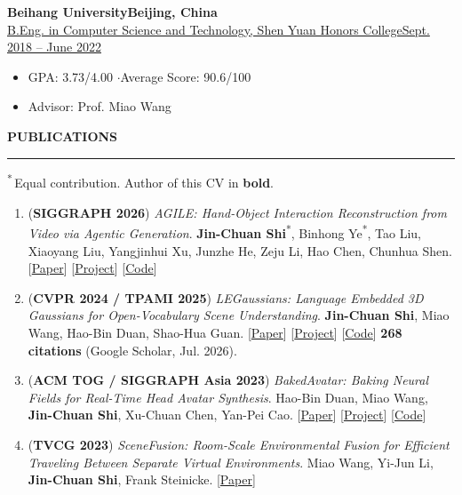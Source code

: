 \documentclass[10pt,a4paper]{article}
\newcommand{\cvsection}[1]{%
  \vspace{0.7em}%
  {\rmfamily\large\bfseries\MakeUppercase{#1}}\\[-0.3em]%
  \rule{\linewidth}{0.5pt}\par\vspace{0.3em}%
}
\newcommand{\cventry}[4]{%
  {\bfseries #1}\hfill{\bfseries #2}\\[0.12em]%
  \uline{#3}\hfill\uline{#4}\par}
\newcommand{\pl}[2]{[\href{#2}{#1}]}
\newcommand{\me}{\textbf{Jin-Chuan Shi}}
\newcommand{\eq}{\textsuperscript{*}}
\begin{document}
\cventry{Beihang University}{Beijing, China}
        {B.Eng. in Computer Science and Technology, Shen Yuan Honors College}
        {Sept. 2018 -- June 2022}
\begin{itemize}
  \item GPA: 3.73/4.00 \quad$\cdot$\quad Average Score: 90.6/100
  \item Advisor: Prof. Miao Wang
\end{itemize}

\cvsection{Publications}
{\small \textsuperscript{*}\,Equal contribution. Author of this CV in \textbf{bold}.}

\begin{enumerate}[label=\arabic*.,leftmargin=1.9em,labelsep=0.4em,itemsep=3pt,topsep=3pt]
  \item (\textbf{SIGGRAPH 2026})
        \textit{AGILE: Hand-Object Interaction Reconstruction from Video via Agentic Generation}.
        \me\eq, Binhong Ye\eq, Tao Liu, Xiaoyang Liu, Yangjinhui Xu, Junzhe He, Zeju Li, Hao Chen, Chunhua Shen.
        \pl{Paper}{https://arxiv.org/abs/2602.04672} \pl{Project}{https://agile-hoi.github.io/} \pl{Code}{https://github.com/Chuan-10/AGILE}

  \item (\textbf{CVPR 2024 / TPAMI 2025})
        \textit{LEGaussians: Language Embedded 3D Gaussians for Open-Vocabulary Scene Understanding}.
        \me, Miao Wang, Hao-Bin Duan, Shao-Hua Guan.
        \pl{Paper}{https://arxiv.org/abs/2311.18482} \pl{Project}{https://buaavrcg.github.io/LEGaussians/} \pl{Code}{https://github.com/Chuan-10/LEGaussians}
        \textbf{268 citations} (Google Scholar, Jul. 2026).

  \item (\textbf{ACM TOG / SIGGRAPH Asia 2023})
        \textit{BakedAvatar: Baking Neural Fields for Real-Time Head Avatar Synthesis}.
        Hao-Bin Duan, Miao Wang, \me, Xu-Chuan Chen, Yan-Pei Cao.
        \pl{Paper}{https://arxiv.org/abs/2311.05521} \pl{Project}{https://buaavrcg.github.io/BakedAvatar/} \pl{Code}{https://github.com/buaavrcg/BakedAvatar}

  \item (\textbf{TVCG 2023})
        \textit{SceneFusion: Room-Scale Environmental Fusion for Efficient Traveling Between Separate Virtual Environments}.
        Miao Wang, Yi-Jun Li, \me, Frank Steinicke.
        \pl{Paper}{https://ieeexplore.ieee.org/document/10113740}


\end{enumerate}
\end{document}

